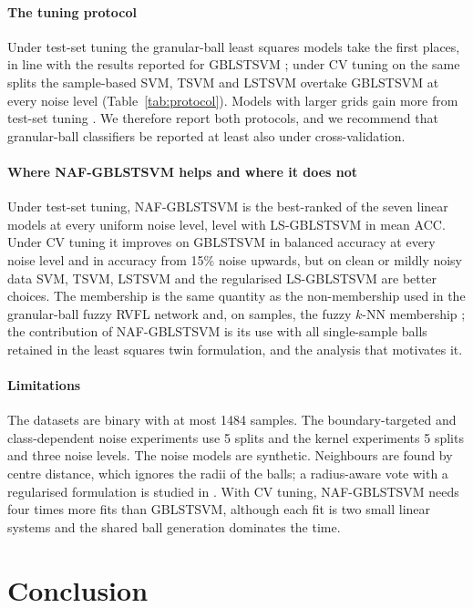 \documentclass[preprint,12pt]{elsarticle}
\newcommand{\NAF}{NAF-GBLSTSVM}
\begin{document}
\paragraph{The tuning protocol} Under test-set tuning the granular-ball least squares models take the first places, in line with the results reported for GBLSTSVM \cite{tanveer2024gblstsvm}; under CV tuning on the same splits the sample-based SVM, TSVM and LSTSVM overtake GBLSTSVM at every noise level (Table~\ref{tab:protocol}). Models with larger grids gain more from test-set tuning \cite{cawley2010,varma2006}. We therefore report both protocols, and we recommend that granular-ball classifiers be reported at least also under cross-validation.

\paragraph{Where \NAF{} helps and where it does not} Under test-set tuning, \NAF{} is the best-ranked of the seven linear models at every uniform noise level, level with LS-GBLSTSVM in mean ACC. Under CV tuning it improves on GBLSTSVM in balanced accuracy at every noise level and in accuracy from 15\% noise upwards, but on clean or mildly noisy data SVM, TSVM, LSTSVM and the regularised LS-GBLSTSVM are better choices. The membership is the same quantity as the non-membership used in the granular-ball fuzzy RVFL network \cite{quadir2026gbfrvfl} and, on samples, the fuzzy $k$-NN membership \cite{keller1985}; the contribution of \NAF{} is its use with all single-sample balls retained in the least squares twin formulation, and the analysis that motivates it.

\paragraph{Limitations} The datasets are binary with at most 1484 samples. The boundary-targeted and class-dependent noise experiments use 5 splits and the kernel experiments 5 splits and three noise levels. The noise models are synthetic. Neighbours are found by centre distance, which ignores the radii of the balls; a radius-aware vote with a regularised formulation is studied in \cite{patel2026rf}. With CV tuning, \NAF{} needs four times more fits than GBLSTSVM, although each fit is two small linear systems and the shared ball generation dominates the time.

\section{Conclusion}
\label{sec:conclusion}
\end{document}
